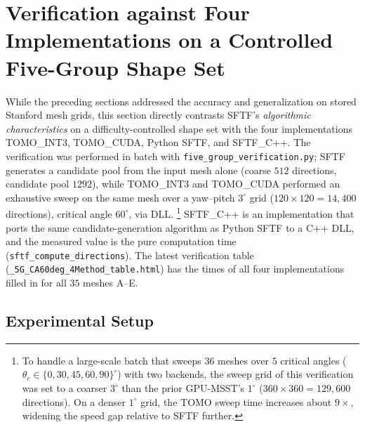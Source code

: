 \documentclass[11pt,a4paper]{article}
\begin{document}
\section{Verification against Four Implementations on a Controlled Five-Group Shape Set}
\label{sec:fivegroup}

While the preceding sections addressed the accuracy and generalization on stored Stanford mesh grids,
this section directly contrasts SFTF's \emph{algorithmic characteristics} on a difficulty-controlled shape set
with the four implementations TOMO\_INT3, TOMO\_CUDA, Python SFTF, and SFTF\_C++.
The verification was performed in batch with \texttt{five\_group\_verification.py};
SFTF generates a candidate pool from the input mesh alone (coarse $512$ directions, candidate pool $1292$),
while TOMO\_INT3 and TOMO\_CUDA performed an exhaustive sweep on the same mesh over a yaw--pitch $3^\circ$ grid
($120\times120=14{,}400$ directions), critical angle $60^\circ$, via DLL.%
\footnote{To handle a large-scale batch that sweeps $36$ meshes over $5$ critical angles ($\theta_c\in\{0,30,45,60,90\}^\circ$) with two backends,
the sweep grid of this verification was set to a coarser $3^\circ$ than the prior GPU-MSST's $1^\circ$
($360\times360=129{,}600$ directions). On a denser $1^\circ$ grid, the TOMO sweep time increases about $9\times$, widening the speed gap relative to SFTF further.}
SFTF\_C++ is an implementation that ports the same candidate-generation algorithm as Python SFTF to a C++ DLL,
and the measured value is the pure computation time (\texttt{sftf\_compute\_directions}).
The latest verification table (\texttt{\_5G\_CA60deg\_4Method\_table.html}) has the times of all four implementations filled in for all $35$ meshes A--E.

\subsection{Experimental Setup}
\end{document}
